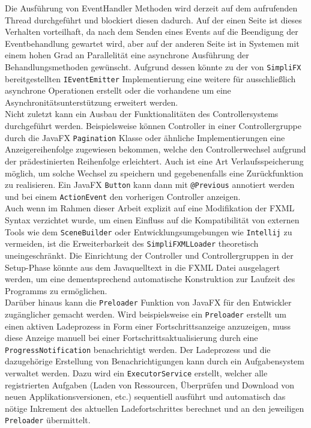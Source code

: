 Die Ausführung von EventHandler Methoden wird derzeit auf dem aufrufenden Thread durchgeführt und blockiert diesen dadurch. Auf der einen Seite ist dieses Verhalten vorteilhaft, da nach dem Senden eines Events auf die Beendigung der Eventbehandlung gewartet wird, aber auf der anderen Seite ist in Systemen mit einem hohen Grad an Parallelität eine asynchrone Ausführung der Behandlungsmethoden gewünscht. Aufgrund dessen könnte zu der von \texttt{SimpliFX} bereitgestellten \texttt{IEventEmitter} Implementierung eine weitere für ausschließlich asynchrone Operationen erstellt oder die vorhandene um eine Asynchronitätsunterstützung erweitert werden.\\
Nicht zuletzt kann ein Ausbau der Funktionalitäten des Controllersystems durchgeführt werden. Beispielsweise können Controller in einer Controllergruppe durch die JavaFX \texttt{Pagination} Klasse oder ähnliche Implementierungen eine Anzeigereihenfolge zugewiesen bekommen, welche den Controllerwechsel aufgrund der prädestinierten Reihenfolge erleichtert. Auch ist eine Art Verlaufsspeicherung möglich, um solche Wechsel zu speichern und gegebenenfalls eine Zurückfunktion zu realisieren. Ein JavaFX \texttt{Button} kann dann mit \texttt{@Previous} annotiert werden und bei einem \texttt{ActionEvent} den vorherigen Controller anzeigen.\\
Auch wenn im Rahmen dieser Arbeit explizit auf eine Modifikation der FXML Syntax verzichtet wurde, um einen Einfluss auf die Kompatibilität von externen Tools wie dem \texttt{SceneBuilder} oder Entwicklungsumgebungen wie \texttt{Intellij} zu vermeiden, ist die Erweiterbarkeit des \texttt{SimpliFXMLLoader} theoretisch uneingeschränkt. Die Einrichtung der Controller und Controllergruppen in der Setup-Phase könnte aus dem Javaquelltext in die FXML Datei ausgelagert werden, um eine dementsprechend automatische Konstruktion zur Laufzeit des Programms zu ermöglichen.\\
Darüber hinaus kann die \texttt{Preloader} Funktion von JavaFX für den Entwickler zugänglicher gemacht werden. Wird beispielsweise ein \texttt{Preloader} erstellt um einen aktiven Ladeprozess in Form einer Fortschrittsanzeige anzuzeigen, muss diese Anzeige manuell bei einer Fortschrittsaktualisierung durch eine \texttt{ProgressNotification} benachrichtigt werden. Der Ladeprozess und die dazugehörige Erstellung von Benachrichtigungen kann durch ein Aufgabensystem verwaltet werden. Dazu wird ein \texttt{ExecutorService} erstellt, welcher alle registrierten Aufgaben (Laden von Ressourcen, Überprüfen und Download von neuen Applikationsversionen, etc.) sequentiell ausführt und automatisch das nötige Inkrement des aktuellen Ladefortschrittes berechnet und an den jeweiligen \texttt{Preloader} übermittelt.
